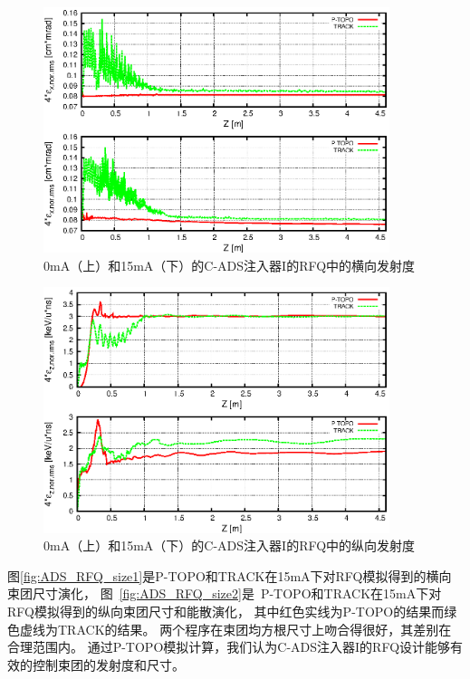 \begin{figure}[!htb]
    \centering
    \includegraphics[width=0.9\textwidth]{Img/ADS_RFQ_emit1.eps}
    \caption{0mA（上）和15mA（下）的C-ADS注入器I的RFQ中的横向发射度}
    \label{fig:ADS_RFQ_emit_transverse}
\end{figure}
\begin{figure}[b]
    \centering
    \includegraphics[width=0.9\textwidth]{Img/ADS_RFQ_emit2.eps}
    \caption{0mA（上）和15mA（下）的C-ADS注入器I的RFQ中的纵向发射度}
    \label{fig:ADS_RFQ_emit_longitudinal}
\end{figure}


图\ref{fig:ADS_RFQ_size1}是P-TOPO和TRACK在15mA下对RFQ模拟得到的横向束团尺寸演化，
图~\ref{fig:ADS_RFQ_size2}是~P-TOPO和TRACK在15mA下对RFQ模拟得到的纵向束团尺寸和能散演化，
其中红色实线为P-TOPO的结果而绿色虚线为TRACK的结果。
两个程序在束团均方根尺寸上吻合得很好，其差别在合理范围内。
通过P-TOPO模拟计算，我们认为C-ADS注入器I的RFQ设计能够有效的控制束团的发射度和尺寸。

